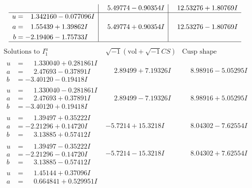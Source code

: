 \documentclass[1p]{elsarticle_modified}
\theoremstyle{definition}
\newcommand{\I}{\sqrt{-1}}
\begin{document}
$$\begin{array}{c|c|c}
 & \phantom{-}5.49774 - 0.90354 I & \phantom{-}12.53276 + 1.80769 I \\ \hline\begin{aligned}
u &= \phantom{-}1.342160 - 0.077096 I \\
a &= \phantom{-}1.55439 + 1.39862 I \\
b &= -2.19406 - 1.75733 I\end{aligned}
 & \phantom{-}5.49774 + 0.90354 I & \phantom{-}12.53276 - 1.80769 I\\
 \hline 
 \end{array}$$\newpage$$\begin{array}{c|c|c}  
\text{Solutions to }I^u_{1}& \I (\text{vol} + \sqrt{-1}CS) & \text{Cusp shape}\\
 \hline 
\begin{aligned}
u &= \phantom{-}1.330040 + 0.281861 I \\
a &= \phantom{-}2.47693 - 0.37891 I \\
b &= -3.40120 - 0.19418 I\end{aligned}
 & \phantom{-}2.89499 + 7.19326 I & \phantom{-}8.98916 - 5.05295 I \\ \hline\begin{aligned}
u &= \phantom{-}1.330040 - 0.281861 I \\
a &= \phantom{-}2.47693 + 0.37891 I \\
b &= -3.40120 + 0.19418 I\end{aligned}
 & \phantom{-}2.89499 - 7.19326 I & \phantom{-}8.98916 + 5.05295 I \\ \hline\begin{aligned}
u &= \phantom{-}1.39497 + 0.35222 I \\
a &= -2.21296 + 0.14720 I \\
b &= \phantom{-}3.13885 + 0.57412 I\end{aligned}
 & -5.7214 + 15.3218 I & \phantom{-}8.04302 - 7.62554 I \\ \hline\begin{aligned}
u &= \phantom{-}1.39497 - 0.35222 I \\
a &= -2.21296 - 0.14720 I \\
b &= \phantom{-}3.13885 - 0.57412 I\end{aligned}
 & -5.7214 - 15.3218 I & \phantom{-}8.04302 + 7.62554 I \\ \hline\begin{aligned}
u &= \phantom{-}1.45144 + 0.37096 I \\
a &= \phantom{-}0.664841 + 0.529951 I \\

\end{aligned}
\end{array}$$
\end{document}
